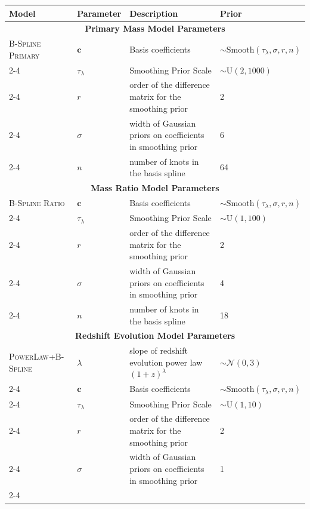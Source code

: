 \begin{table}[b!]
    \centering
    \begin{tabular}{|l|l|l|l|}
    \hline
    \textbf{Model} & \textbf{Parameter} & \textbf{Description} & \textbf{Prior} \\ \hline \hline
    \multicolumn{4}{|c|}{\textbf{Primary Mass Model Parameters}} \\ \hline
    \textsc{B-Spline Primary} & $\bm{c}$ & Basis coefficients & $\sim \mathrm{Smooth}(\tau_\lambda, \sigma, r, n)$ \\ \cline{2-4} 
     & $\tau_\lambda$ & Smoothing Prior Scale & $\sim \mathrm{U}(2,1000)$ \\ \cline{2-4}
     & $r$ & order of the difference matrix for the smoothing prior & 2 \\ \cline{2-4} 
     & $\sigma$ & width of Gaussian priors on coefficients in smoothing prior & 6 \\ \cline{2-4} 
     & $n$ & number of knots in the basis spline & 64 \\ \hline \hline 
    \multicolumn{4}{|c|}{\textbf{Mass Ratio Model Parameters}} \\ \hline
    \textsc{B-Spline Ratio} & $\bm{c}$ & Basis coefficients & $\sim \mathrm{Smooth}(\tau_\lambda, \sigma, r, n)$ \\ \cline{2-4} 
     & $\tau_\lambda$ & Smoothing Prior Scale & $\sim \mathrm{U}(1,100)$ \\ \cline{2-4}
     & $r$ & order of the difference matrix for the smoothing prior & 2 \\ \cline{2-4} 
     & $\sigma$ & width of Gaussian priors on coefficients in smoothing prior & 4 \\ \cline{2-4} 
     & $n$ & number of knots in the basis spline & 18 \\ \hline \hline
    \multicolumn{4}{|c|}{\textbf{Redshift Evolution Model Parameters}} \\ \hline
    \textsc{PowerLaw+B-Spline} & $\lambda$ & slope of redshift evolution power law $(1+z)^\lambda$ &  $\sim \mathcal{N}(0,3)$ \\ \cline{2-4}
    & $\bm{c}$ & Basis coefficients & $\sim \mathrm{Smooth}(\tau_\lambda, \sigma, r, n)$ \\ \cline{2-4} 
     & $\tau_\lambda$ & Smoothing Prior Scale & $\sim \mathrm{U}(1,10)$ \\ \cline{2-4}
     & $r$ & order of the difference matrix for the smoothing prior & 2 \\ \cline{2-4} 
     & $\sigma$ & width of Gaussian priors on coefficients in smoothing prior & 1 \\ \cline{2-4} 

\end{tabular}
\end{table}
